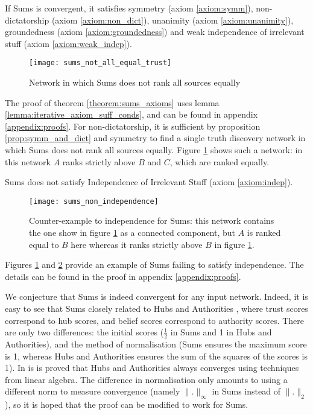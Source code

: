 \documentclass[../main.tex]{subfiles}
\begin{document}
\begin{theorem}
\label{theorem:sums_axioms}
If Sums is convergent, it satisfies symmetry (axiom \ref{axiom:symm}),
non-dictatorship (axiom \ref{axiom:non_dict}), unanimity (axiom
\ref{axiom:unanimity}), groundedness (axiom \ref{axiom:groundedness}) and
weak independence of irrelevant stuff (axiom \ref{axiom:weak_indep}).
\end{theorem}

\begin{figure}
    \centering
    \texttt{[image: sums\_not\_all\_equal\_trust]}
    \caption{Network in which Sums does not rank all sources equally}
    \label{img:sums_not_all_equal_trust}
\end{figure}

The proof of theorem \ref{theorem:sums_axioms} uses lemma
\ref{lemma:iterative_axiom_suff_conds}, and can be found in appendix
\ref{appendix:proofs}. For non-dictatorship, it is sufficient by proposition
\ref{prop:symm_and_dict} and symmetry to find a single truth discovery network
in which Sums does not rank all sources equally. Figure
\ref{img:sums_not_all_equal_trust} shows such a network: in this network $A$
ranks strictly above $B$ and $C$, which are ranked equally.

\begin{theorem}
\label{theorem:sums_non_indep}
Sums does not satisfy Independence of Irrelevant Stuff (axiom
\ref{axiom:indep}).
\end{theorem}

\begin{figure}
    \centering
    \texttt{[image: sums\_non\_independence]}
    \caption{
        Counter-example to independence for Sums: this network contains the one
        show in figure \ref{img:sums_not_all_equal_trust} as a connected
        component, but $A$ is ranked equal to $B$ here whereas it ranks
        strictly above $B$ in figure \ref{img:sums_not_all_equal_trust}.
    }
    \label{img:sums_non_indep}
\end{figure}

Figures \ref{img:sums_not_all_equal_trust} and \ref{img:sums_non_indep}
provide an example of Sums failing to satisfy independence. The details can be
found in the proof in appendix \ref{appendix:proofs}.

We conjecture that Sums is indeed convergent for any input network. Indeed, it
is easy to see that Sums closely related to Hubs and Authorities
\cite{kleinberg}, where trust scores correspond to hub scores, and belief
scores correspond to authority scores. There are only two differences: the
initial scores ($\frac{1}{2}$ in Sums and 1 in Hubs and Authorities), and the
method of normalisation (Sums ensures the maximum score is 1, whereas Hubs and
Authorities ensures the sum of the squares of the scores is 1). In
\cite{kleinberg} is is proved that Hubs and Authorities always converges using
techniques from linear algebra. The difference in normalisation only amounts to
using a different norm to measure convergence (namely $\|.\|_{\infty}$ in Sums
instead of $\|.\|_2$), so it is hoped that the proof can be modified to work
for Sums.
\end{document}
